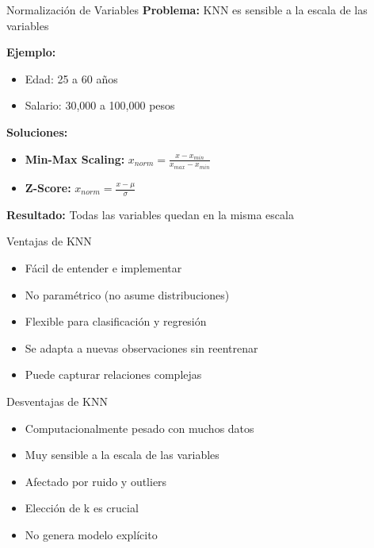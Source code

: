 \documentclass{beamer}
\begin{document}
\begin{frame}{Normalización de Variables}
    \textbf{Problema:} KNN es sensible a la escala de las variables
    
    \vspace{0.3cm}
    
    \textbf{Ejemplo:}
    \begin{itemize}
        \item Edad: 25 a 60 años
        \item Salario: 30,000 a 100,000 pesos
    \end{itemize}
    
    \vspace{0.3cm}
    
    \textbf{Soluciones:}
    \begin{itemize}
        \item \textbf{Min-Max Scaling:} $x_{norm} = \frac{x - x_{min}}{x_{max} - x_{min}}$
        \item \textbf{Z-Score:} $x_{norm} = \frac{x - \mu}{\sigma}$
    \end{itemize}
    
    \vspace{0.5cm}
    
    \textbf{Resultado:} Todas las variables quedan en la misma escala
\end{frame}

\begin{frame}{Ventajas de KNN}
    \begin{itemize}
        \item Fácil de entender e implementar
        \item No paramétrico (no asume distribuciones)
        \item Flexible para clasificación y regresión
        \item Se adapta a nuevas observaciones sin reentrenar
        \item Puede capturar relaciones complejas
    \end{itemize}
\end{frame}

\begin{frame}{Desventajas de KNN}
    \begin{itemize}
        \item Computacionalmente pesado con muchos datos
        \item Muy sensible a la escala de las variables
        \item Afectado por ruido y outliers
        \item Elección de k es crucial
        \item No genera modelo explícito
    \end{itemize}
\end{frame}
\end{document}
